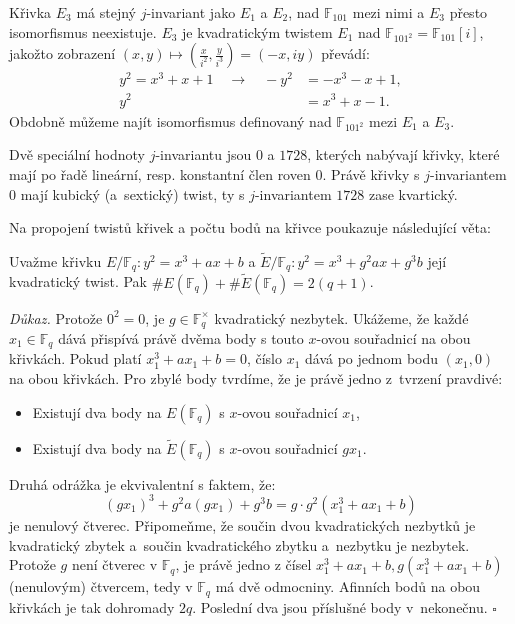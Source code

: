 \documentclass[12pt]{report}
\begin{document}
\begin{priklad}
Křivka $E_3$ má stejný $j$-invariant jako $E_1$ a $E_2$, nad $\mathbb{F}_{101}$ mezi nimi a $E_3$ přesto isomorfismus neexistuje. $E_3$ je kvadratickým twistem $E_1$ nad $\mathbb{F}_{101^2} = \mathbb{F}_{101}[i]$, jakožto zobrazení $(x,y) \mapsto \left(\frac{x}{i^2}, \frac{y}{i^3}\right) = (-x,iy)$ převádí:
\begin{align*}
y^2 = x^3+x+1 \quad \longrightarrow \quad -y^2 &= -x^3-x+1,\\
 y^2 &=  x^3 + x - 1.
\end{align*}
Obdobně můžeme najít isomorfismus definovaný nad $\mathbb{F}_{101^2}$ mezi $E_1$ a $E_3$.\end{priklad}

Dvě speciální hodnoty $j$-invariantu jsou $0$ a $1728$, kterých nabývají křivky, které mají po řadě lineární, resp. konstantní člen roven $0$. Právě křivky s $j$-invariantem $0$ mají kubický (a~sextický) twist, ty s $j$-invariantem $1728$ zase kvartický.

Na propojení twistů křivek a počtu bodů na křivce poukazuje následující věta:

\begin{veta}\label{twister}
Uvažme křivku $E/\mathbb{F}_q : y^2 = x^3+ax+b$ a  $ \tilde{E}/\mathbb{F}_q : y^2 = x^3 + g^2 ax + g^3 b $ její kvadratický twist. Pak $\#E(\mathbb{F}_q) + \# \tilde{E}(\mathbb{F}_q) = 2(q+1)$.
\end{veta}
\noindent \textit{Důkaz.} Protože $0^2= 0$, je $g \in \mathbb{F}^\times_q$ kvadratický nezbytek. Ukážeme, že každé $x_1 \in \mathbb{F}_q$ dává přispívá právě dvěma body s touto $x$-ovou souřadnicí na obou křivkách. Pokud platí $x_1^3 + ax_1 + b = 0$, číslo $x_1$ dává po jednom bodu $(x_1,0)$ na obou křivkách. Pro zbylé body tvrdíme, že je právě jedno z~tvrzení pravdivé: 
\begin{itemize}
\item Existují dva body na $E(\mathbb{F}_q)$ s $x$-ovou souřadnicí $x_1$,
\item Existují dva body na $\tilde{E}(\mathbb{F}_q)$ s $x$-ovou souřadnicí $gx_1$.
\end{itemize}
Druhá odrážka je ekvivalentní s faktem, že: 
\begin{equation*}
(gx_1)^3 + g^2 a (gx_1) + g^3 b = g \cdot g^2 (x_1^3+ax_1+b)
\end{equation*}
je nenulový čtverec. Připomeňme, že součin dvou kvadratických nezbytků je kvadratický zbytek a~součin kvadratického zbytku a~nezbytku je nezbytek. Protože $g$ není čtverec v $\mathbb{F}_q$, je právě jedno z čísel $x_1 ^3 + ax_1 + b, g(x_1 ^3 + ax_1 + b)$ (nenulovým) čtvercem, tedy v $\mathbb{F}_q$ má dvě odmocniny. Afinních bodů na obou křivkách je tak dohromady $2q$. Poslední dva jsou příslušné body v~nekonečnu. \hfill $\square$\\
\end{document}
